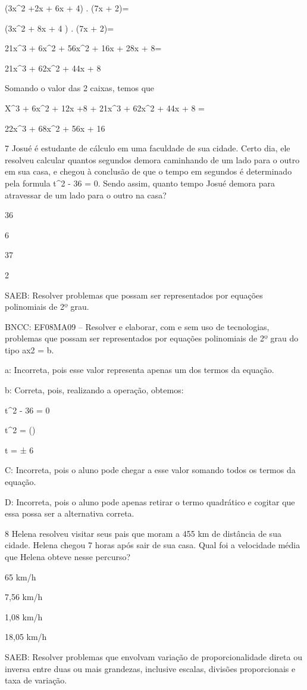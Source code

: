 {(3x^2 +2x + 6x + 4) . (7x + 2)=

(3x^2 + 8x + 4 ) . (7x + 2)=

21x^3 + 6x^2 + 56x^2 + 16x + 28x + 8=

21x^3 + 62x^2 + 44x + 8

Somando o valor das 2 caixas, temos que

X^3 + 6x^2 + 12x +8 + 21x^3 + 62x^2 + 44x + 8 =

22x^3 + 68x^2 + 56x + 16

\num{7} Josué é estudante de cálculo em uma faculdade de sua cidade. Certo
dia, ele resolveu calcular quantos segundos demora caminhando de um lado
para o outro em sua casa, e chegou à conclusão de que o tempo em
segundos é determinado pela formula t^2 - 36 = 0. Sendo assim, quanto
tempo Josué demora para atravessar de um lado para o outro na casa?
\item 36
\item 6
\item 37
\item 2

SAEB: Resolver problemas que possam ser representados por equações
polinomiais de 2º grau.

BNCC: EF08MA09 -- Resolver e elaborar, com e sem uso de tecnologias,
problemas que possam ser representados por equações polinomiais de 2º
grau do tipo ax2 = b.

a: Incorreta, pois esse valor representa apenas um dos termos da
equação.

b: Correta, pois, realizando a operação, obtemos:

t^2 - 36 = 0

t^2 = ()

t = ± 6

C: Incorreta, pois o aluno pode chegar a esse valor somando todos os
termos da equação.

D: Incorreta, pois o aluno pode apenas retirar o termo quadrático e
cogitar que essa possa ser a alternativa correta.

\num{8} Helena resolveu visitar seus pais que moram a 455 km de distância de
sua cidade. Helena chegou 7 horas após sair de sua casa. Qual foi a
velocidade média que Helena obteve nesse percurso?
\item 65 km/h
\item 7,56 km/h
\item 1,08 km/h
\item 18,05 km/h

SAEB: Resolver problemas que envolvam variação de proporcionalidade
direta ou inversa entre duas ou mais grandezas, inclusive escalas,
divisões proporcionais e taxa de variação.

}
